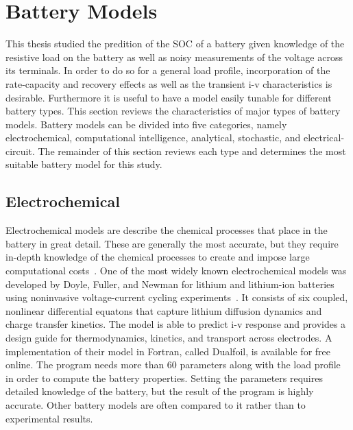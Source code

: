 \documentclass[../zhang_thesis.tex]{subfiles}
\begin{document}


\section{Battery Models}

This thesis studied the predition of the SOC of a battery given knowledge of the resistive load on the battery as well as noisy measurements of the voltage across its terminals. In order to do so for a general load profile, incorporation of the rate-capacity and recovery effects as well as the transient i-v characteristics is desirable. Furthermore it is useful to have a model easily tunable for different battery types. This section reviews the characteristics of major types of
battery models. Battery models can be divided into five categories, namely electrochemical, computational intelligence, analytical, stochastic, and electrical-circuit. The remainder of this section reviews each type and determines the most suitable battery model for this study.

\subsection{Electrochemical}

Electrochemical models are describe the chemical processes that place in the battery in great detail. These are generally the most accurate, but they require in-depth knowledge of the chemical processes to create and impose large computational costs~\cite{jongerden09}. One of the most widely known electrochemical models was developed by Doyle, Fuller, and Newman for lithium and lithium-ion batteries using noninvasive voltage-current cycling
experiments~\cite{doyle93,fuller94,fuller94b}. It consists of six coupled, nonlinear differential equatons that capture lithium diffusion dynamics and charge transfer kinetics. The model is able to predict i-v response and provides a design guide for thermodynamics, kinetics, and transport across electrodes. A implementation of their model in Fortran, called Dualfoil, is available for free online. The program needs more than 60 parameters along with the load profile
in order to compute the battery properties. Setting the parameters requires detailed knowledge of the battery, but the result of the program is highly accurate. Other battery models are often compared to it rather than to experimental results.
\end{document}
